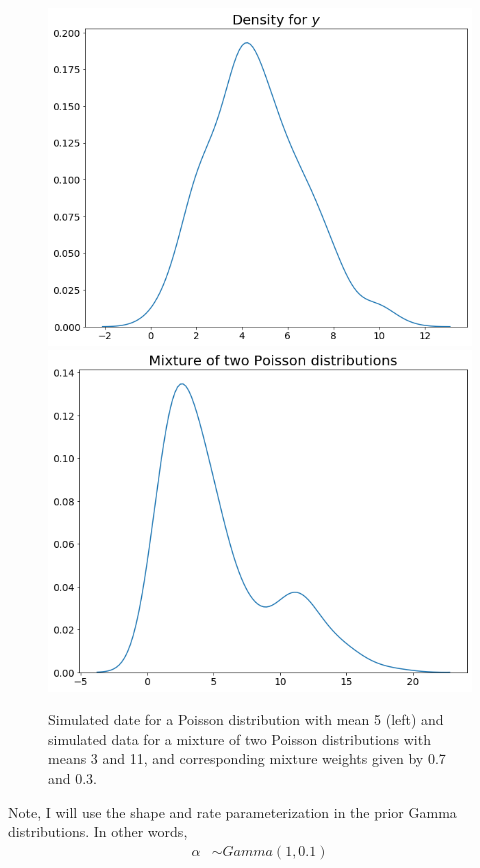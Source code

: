 \documentclass[a4paper, 10pt]{article}
\begin{document}
\begin{enumerate}
\begin{figure}[h!]
        \includegraphics[scale = 0.3]{2a_true_dens.png}\includegraphics[scale = 0.3]{2b_true_dens.png}
        \caption{Simulated date for a Poisson distribution with mean 5 (left) and simulated data for a mixture of two Poisson distributions with means 3 and 11, and corresponding mixture weights given by 0.7 and 0.3.}
        \label{sim_data_2}
    \end{figure}
    Note, I will use the shape and rate parameterization in the prior Gamma distributions. In other words,
    \begin{align*}
        \alpha &\sim Gamma(1, 0.1)\\

\end{align*}
\end{enumerate}
\end{document}
